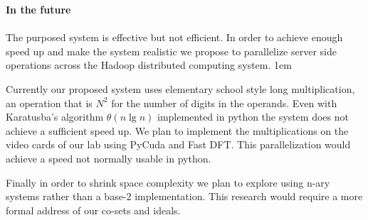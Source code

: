 \documentclass[11pt]{article}
\begin{document}
\textbf{In the future}\\ \\
\hspace{1em}The purposed system is effective but not efficient. In order to achieve enough speed up and make the system realistic we propose to parallelize server side operations across the Hadoop distributed computing system.
\parskip 1em

\hspace{1em}Currently our proposed system uses elementary school style long multiplication, an operation that is \(N^2\) for the number of digits in the operands. Even with Karatusba's algorithm \(\theta( n \lg n)\) implemented in python the system does not achieve a sufficient speed up. We plan to implement the multiplications on the video cards of our lab using PyCuda and Fast DFT. This parallelization would achieve a speed not normally usable in python.


\hspace{1em}Finally in order to shrink space complexity we plan to explore using n-ary systems rather than a base-2 implementation. This research would require a more formal address of our co-sets and ideals.
\end{document}
